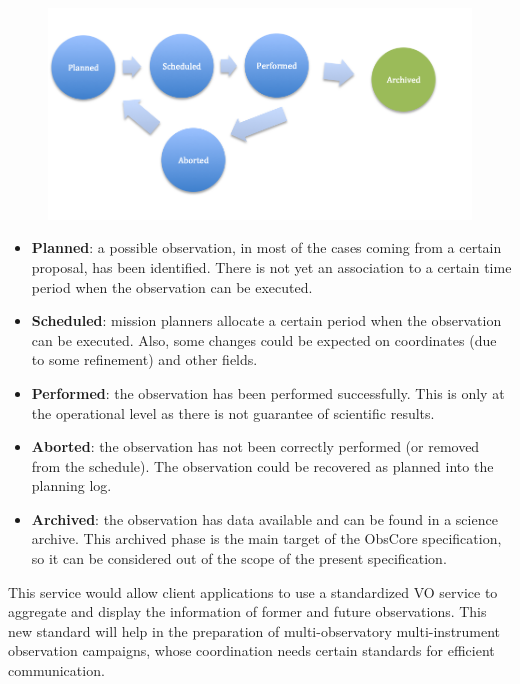 \documentclass[11pt,a4paper]{ivoa}
\begin{document}
\begin{figure}[H]
\advance\leftskip 0.0in		\hfill\includegraphics{./media/observations_workflow.png}\hfill\strut%
\end{figure}

\begin{itemize}
	\item \textbf{Planned}: a possible observation, in most of the cases coming from a certain proposal, has been identified. There is not yet an association to a certain time period when the observation can be executed.

	\item \textbf{Scheduled}: mission planners allocate a certain period when the observation can be executed. Also, some changes could be expected on coordinates (due to some refinement) and other fields.

	\item \textbf{Performed}: the observation has been performed successfully. This is only at the operational level as there is not guarantee of scientific results.

	\item \textbf{Aborted}: the observation has not been correctly performed (or removed from the schedule). The observation could be recovered as planned into the planning log.

	\item \textbf{Archived}: the observation has data available and can be found in a science archive. This archived phase is the main target of the ObsCore specification, so it can be considered out of the scope of the present specification.
\end{itemize}

This service would allow client applications to use a standardized VO service to aggregate and display the information of former and future observations. This new standard will help in the preparation of multi-observatory multi-instrument observation campaigns, whose coordination needs certain standards for efficient communication.
\end{document}
